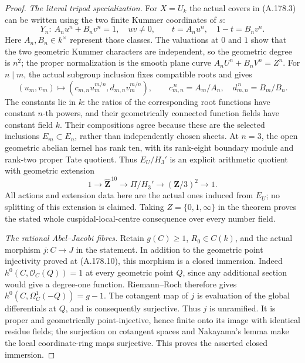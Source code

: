 \begin{proof}
\emph{The literal tripod specialization.}
For \(X=U_k\) the actual covers in (A.178.3) can be
written using the two finite Kummer coordinates of \(s\):
\[
 Y_n:\ A_n u^n+B_n v^n=1,\quad uv\ne0,\qquad
                      t=A_nu^n,\quad 1-t=B_nv^n.
\tag{A.178.19}
\]
Here \(A_n,B_n\in k^\times\) represent those classes.
The valuations at \(0\) and \(1\) show that the two
geometric Kummer characters are independent, so the
geometric degree is \(n^2\); the proper normalization
is the smooth plane curve
\(A_nU^n+B_nV^n=Z^n\).
For \(n\mid m\), the actual subgroup inclusion fixes
compatible roots and gives
\[
 (u_m,v_m)\longmapsto
     (c_{m,n}u_m^{m/n},d_{m,n}v_m^{m/n}),\qquad
 c_{m,n}^{\,n}=A_m/A_n,\quad
 d_{m,n}^{\,n}=B_m/B_n.
\tag{A.178.20}
\]
The constants lie in \(k\): the ratios of the corresponding
root functions have constant \(n\)-th powers, and their
geometrically connected function fields have constant
field \(k\).  Their compositions agree because these are
the selected inclusions \(E_m\subset E_n\), rather than
independently chosen sheets.
At \(n=3\), the open geometric abelian kernel has rank ten,
with its rank-eight boundary module and rank-two proper
Tate quotient.  Thus \(E_U/H_3'\) is an explicit arithmetic
quotient with geometric extension
\[
              1\longrightarrow\widehat{\mathbf Z}^{\,10}
                 \longrightarrow\Pi/H_3'
                 \longrightarrow(\mathbf Z/3)^2
                 \longrightarrow1.
\tag{A.178.21}
\]
All actions and extension data here are the actual ones
induced from \(E_U\); no splitting of this extension is
claimed.  Taking \(Z=\{0,1,\infty\}\) in the theorem
proves the stated whole cuspidal-local-centre consequence
over every number field.

\emph{The rational Abel--Jacobi fibres.}
Retain \(g(C)\ge1\), \(R_0\in C(k)\), and the actual morphism
\(j:C\to J\) in the statement.  In addition to the geometric
point injectivity proved at (A.178.10), this morphism is a
closed immersion.  Indeed \(h^0(C,\mathcal O_C(Q))=1\)
at every geometric point \(Q\), since any additional section
would give a degree-one function.  Riemann--Roch therefore
gives
\(h^0(C,\Omega_C^1(-Q))=g-1\).
The cotangent map of \(j\) is evaluation of the global
differentials at \(Q\), and is consequently surjective.
Thus \(j\) is unramified.  It is proper and geometrically
point-injective, hence finite onto its image with identical
residue fields; the surjection on cotangent spaces and
Nakayama's lemma make the local coordinate-ring maps
surjective.  This proves the asserted closed immersion.


\end{proof}
